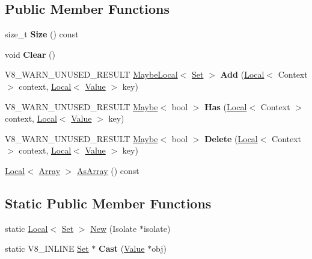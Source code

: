 \subsection*{Public Member Functions}
\begin{DoxyCompactItemize}
\item 
\mbox{\label{classv8_1_1Set_af44475aaf38b9429e129d62c34bcc024}} 
size\+\_\+t {\bfseries Size} () const
\item 
\mbox{\label{classv8_1_1Set_a5f7e4dbd6729a503ca617415d5eeedf0}} 
void {\bfseries Clear} ()
\item 
\mbox{\label{classv8_1_1Set_adb56ad9dfa7541746b7894c359095801}} 
V8\+\_\+\+W\+A\+R\+N\+\_\+\+U\+N\+U\+S\+E\+D\+\_\+\+R\+E\+S\+U\+LT \mbox{\hyperlink{classv8_1_1MaybeLocal}{Maybe\+Local}}$<$ \mbox{\hyperlink{classv8_1_1Set}{Set}} $>$ {\bfseries Add} (\mbox{\hyperlink{classv8_1_1Local}{Local}}$<$ Context $>$ context, \mbox{\hyperlink{classv8_1_1Local}{Local}}$<$ \mbox{\hyperlink{classv8_1_1Value}{Value}} $>$ key)
\item 
\mbox{\label{classv8_1_1Set_a45a2c9e7b69d7bc7e94521d1ebfcce1d}} 
V8\+\_\+\+W\+A\+R\+N\+\_\+\+U\+N\+U\+S\+E\+D\+\_\+\+R\+E\+S\+U\+LT \mbox{\hyperlink{classv8_1_1Maybe}{Maybe}}$<$ bool $>$ {\bfseries Has} (\mbox{\hyperlink{classv8_1_1Local}{Local}}$<$ Context $>$ context, \mbox{\hyperlink{classv8_1_1Local}{Local}}$<$ \mbox{\hyperlink{classv8_1_1Value}{Value}} $>$ key)
\item 
\mbox{\label{classv8_1_1Set_a638909072ad2de7fe0e207e4889ea9bf}} 
V8\+\_\+\+W\+A\+R\+N\+\_\+\+U\+N\+U\+S\+E\+D\+\_\+\+R\+E\+S\+U\+LT \mbox{\hyperlink{classv8_1_1Maybe}{Maybe}}$<$ bool $>$ {\bfseries Delete} (\mbox{\hyperlink{classv8_1_1Local}{Local}}$<$ Context $>$ context, \mbox{\hyperlink{classv8_1_1Local}{Local}}$<$ \mbox{\hyperlink{classv8_1_1Value}{Value}} $>$ key)
\item 
\mbox{\hyperlink{classv8_1_1Local}{Local}}$<$ \mbox{\hyperlink{classv8_1_1Array}{Array}} $>$ \mbox{\hyperlink{classv8_1_1Set_aa4e8576e0a657bcd61364f3bc26e2b56}{As\+Array}} () const
\end{DoxyCompactItemize}
\subsection*{Static Public Member Functions}
\begin{DoxyCompactItemize}
\item 
static \mbox{\hyperlink{classv8_1_1Local}{Local}}$<$ \mbox{\hyperlink{classv8_1_1Set}{Set}} $>$ \mbox{\hyperlink{classv8_1_1Set_a036e773566a36997a79e78ef0a4103a1}{New}} (Isolate $\ast$isolate)
\item 
\mbox{\label{classv8_1_1Set_a1739da4ee6bf39c381b83023f653e995}} 
static V8\+\_\+\+I\+N\+L\+I\+NE \mbox{\hyperlink{classv8_1_1Set}{Set}} $\ast$ {\bfseries Cast} (\mbox{\hyperlink{classv8_1_1Value}{Value}} $\ast$obj)
\end{DoxyCompactItemize}


